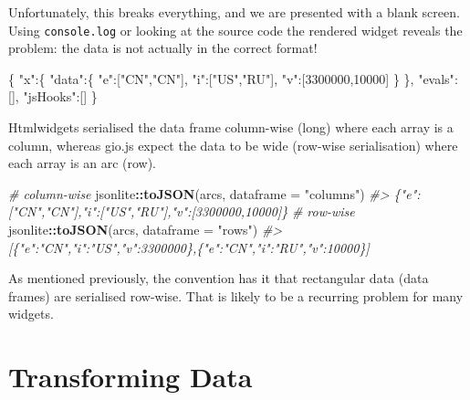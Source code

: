 \documentclass[
  10pt,
]{krantz}
\makeatletter
\newenvironment{Shaded}{\begin{snugshade}}{\end{snugshade}}
\newcommand{\CommentTok}[1]{\textcolor[rgb]{0.37,0.37,0.37}{\textit{#1}}}
\newcommand{\DataTypeTok}[1]{\textcolor[rgb]{0.27,0.27,0.27}{#1}}
\newcommand{\DecValTok}[1]{\textcolor[rgb]{0.06,0.06,0.06}{#1}}
\newcommand{\FunctionTok}[1]{\textcolor[rgb]{0,0,0}{#1}}
\newcommand{\KeywordTok}[1]{\textcolor[rgb]{0.27,0.27,0.27}{\textbf{#1}}}
\newcommand{\NormalTok}[1]{#1}
\newcommand{\OperatorTok}[1]{\textcolor[rgb]{0.43,0.43,0.43}{\textbf{#1}}}
\newcommand{\OtherTok}[1]{\textcolor[rgb]{0.37,0.37,0.37}{#1}}
\newcommand{\StringTok}[1]{\textcolor[rgb]{0.5,0.5,0.5}{#1}}
\newenvironment{kframe}{%
\medskip{}
\setlength{\fboxsep}{.8em}
 \def\at@end@of@kframe{}%
 \ifinner\ifhmode%
  \def\at@end@of@kframe{\end{minipage}}%
  \begin{minipage}{\columnwidth}%
 \fi\fi%
 \def\FrameCommand##1{\hskip\@totalleftmargin \hskip-\fboxsep
 \colorbox{shadecolor}{##1}\hskip-\fboxsep
     \hskip-\linewidth \hskip-\@totalleftmargin \hskip\columnwidth}%
 \MakeFramed {\advance\hsize-\width
   \@totalleftmargin\z@ \linewidth\hsize
   \@setminipage}}%
 {\par\unskip\endMakeFramed%
 \at@end@of@kframe}
\renewenvironment{Shaded}{\begin{kframe}}{\end{kframe}}
\makeatother
\begin{document}
Unfortunately, this breaks everything, and we are presented with a blank screen. Using \texttt{console.log} or looking at the source code the rendered widget reveals the problem: the data is not actually in the correct format!

\begin{Shaded}
\begin{Highlighting}[]
\FunctionTok{\{}
  \DataTypeTok{"x"}\FunctionTok{:\{}
    \DataTypeTok{"data"}\FunctionTok{:\{}
      \DataTypeTok{"e"}\FunctionTok{:}\OtherTok{[}\StringTok{"CN"}\OtherTok{,}\StringTok{"CN"}\OtherTok{]}\FunctionTok{,}
      \DataTypeTok{"i"}\FunctionTok{:}\OtherTok{[}\StringTok{"US"}\OtherTok{,}\StringTok{"RU"}\OtherTok{]}\FunctionTok{,}
      \DataTypeTok{"v"}\FunctionTok{:}\OtherTok{[}\DecValTok{3300000}\OtherTok{,}\DecValTok{10000}\OtherTok{]}
    \FunctionTok{\}}
  \FunctionTok{\},}
  \DataTypeTok{"evals"}\FunctionTok{:}\OtherTok{[]}\FunctionTok{,}
  \DataTypeTok{"jsHooks"}\FunctionTok{:}\OtherTok{[]}
\FunctionTok{\}}
\end{Highlighting}
\end{Shaded}

Htmlwidgets serialised the data frame column-wise (long) where each array is a column, whereas gio.js expect the data to be wide (row-wise serialisation) where each array is an arc (row).

\begin{Shaded}
\begin{Highlighting}[]
\CommentTok{\# column{-}wise}
\NormalTok{jsonlite}\OperatorTok{::}\KeywordTok{toJSON}\NormalTok{(arcs, }\DataTypeTok{dataframe =} \StringTok{"columns"}\NormalTok{)}
\CommentTok{\#> \{"e":["CN","CN"],"i":["US","RU"],"v":[3300000,10000]\}}
\CommentTok{\# row{-}wise}
\NormalTok{jsonlite}\OperatorTok{::}\KeywordTok{toJSON}\NormalTok{(arcs, }\DataTypeTok{dataframe =} \StringTok{"rows"}\NormalTok{)}
\CommentTok{\#> [\{"e":"CN","i":"US","v":3300000\},\{"e":"CN","i":"RU","v":10000\}]}
\end{Highlighting}
\end{Shaded}

As mentioned previously, the convention has it that rectangular data (data frames) are serialised row-wise. That is likely to be a recurring problem for many widgets.

\hypertarget{widgets-full-transform-data}{%
\section{Transforming Data}\label{widgets-full-transform-data}}
\end{document}
